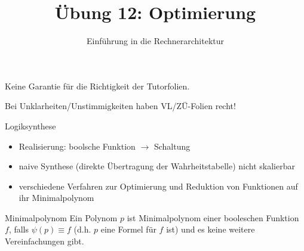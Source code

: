 


\title{Übung 12: Optimierung}
\subtitle{Einführung in die Rechnerarchitektur}
\date{}




\maketitle

\begin{frame}[c, fragile]{}{}
	\begin{center}
		\LARGE  Keine Garantie für die Richtigkeit der Tutorfolien.

		\Large Bei Unklarheiten/Unstimmigkeiten haben VL/ZÜ-Folien recht!
	\end{center}
\end{frame}

\begin{frame}[fragile, c]{Logiksynthese}{}
	\begin{itemize}
		\item Realisierung: boolsche Funktion $\rightarrow$ Schaltung
		\item naive Synthese (direkte Übertragung der Wahrheitstabelle) nicht skalierbar
		\item verschiedene Verfahren zur Optimierung und Reduktion von Funktionen auf ihr Minimalpolynom
	\end{itemize}
	\begin{block}{Minimalpolynom}
		Ein Polynom $p$ ist Minimalpolynom einer booleschen Funktion $f$, falls  $\psi(p) \equiv f$ (d.h. $p$ eine Formel für $f$ ist) und es keine weitere Vereinfachungen gibt.
	\end{block}
\end{frame}


